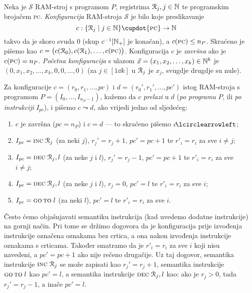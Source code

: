 \begin{definicija}[{name=[RAM-konfiguracije i prijelazi među njima]}]\label{def:RAMconf}
Neka je $\mathcal S$ RAM-stroj s programom $P$, registrima $\mathcal R_{j},j\in{\mathbb N}$ te programskim brojačem \textsc{pc}. \emph{Konfiguracija} RAM-stroja $\mathcal S$ je bilo koje preslikavanje
\begin{equation}
    c:\{\reg{j}\mid j\in\N\}\dcup\{\textsc{pc}\}\to\N
\end{equation} takvo da je skoro svuda $0$ (skup $c^{-1}[{\mathbb N}_+]$ je konačan), a $c(\textsc{pc})\le n_P$. Skraćeno je pišemo kao $c=\bigl(c(\mathcal R_{0}),c(\mathcal R_{1}),\dotsc,c(\textsc{pc})\bigr)$. Konfiguracija $c$ je \emph{završna} ako je $c(\textsc{pc})=n_P$. \emph{Početna konfiguracija} s ulazom $\vec x=(x_1,x_2,\dotsc,x_k)\in{\mathbb N}^k$ je $(0,x_1,x_2,\dotsc,x_k,0,0,\dotsc,0)$ (za $j\in[1\dd k]$ u $\mathcal R_{j}$ je $x_j$, svugdje drugdje su nule).

    Za konfiguracije $c=(r_0,r_1,\dotsc,pc)$ i $d=(r_0',r_1',\dotsc,pc')$ istog RAM-stroja s programom $P=(I_0,\dotsc,I_{n_P-1})$, kažemo da $c$ \emph{prelazi} u $d$ (\emph{po programu} $P$, ili \emph{po instrukciji} $I_{pc}$), i pišemo $c\leadsto d$, ako vrijedi jedno od sljedećeg:
\begin{enumerate}
    \item\label{stav:leadzav}
    $c$ je završna ($pc=n_P$) i $c=d$ --- to skraćeno pišemo $c\!\lcirclearrowleft$\!;
    \item\label{stav:leadINC}
    $I_{pc}=\textsc{inc}\;\mathcal R_{j}$ (za neki $j$), $r_j'=r_j+1$, $pc'=pc+1$ te $r'_i=r_i$ za sve $i\ne j$;
    \item\label{stav:leadDEC-}
    $I_{pc}=\textsc{dec}\;\mathcal R_{j},l$ (za neke $j$ i $l$),  $r_j'=r_j-1$, $pc'=pc+1$ te $r'_i=r_i$ za sve $i\ne j$;
    \item\label{stav:leadDEC0}
    $I_{pc}=\textsc{dec}\;\mathcal R_{j},l$ (za neke $j$ i $l$), $r_j=0$, $pc'=l$ te $r'_i=r_i$ za sve $i$;
    \item\label{stav:leadGOTO}
    $I_{pc}=\textsc{go\,to}\;l$ (za neki $l$), $pc'=l$ te $r'_i=r_i$ za sve $i$.\qedhere
\end{enumerate}
\end{definicija}

Često ćemo objašnjavati semantiku instrukcija (kad uvedemo dodatne instrukcije) na gornji način. Pri tome se držimo dogovora da je konfiguracija prije izvođenja instrukcije označena oznakama bez crtica, a ona nakon izvođenja instrukcije oznakama s crticama. Također smatramo da je $r'_i=r_i$ za sve $i$ koji nisu navedeni, a $pc'=pc+1$ ako nije rečeno drugačije. Uz taj dogovor, semantika instrukcije $\textsc{inc}\;\mathcal R_{j}$ se može zapisati kao $r_j'=r_j+1$, semantika instrukcije $\textsc{go\,to}\;l$ kao $pc'=l$, a semantika instrukcije $\textsc{dec}\;\mathcal R_{j},l$ kao: ako je $r_j>0$, tada $r_j'=r_j-1$, a inače $pc'=l$.

